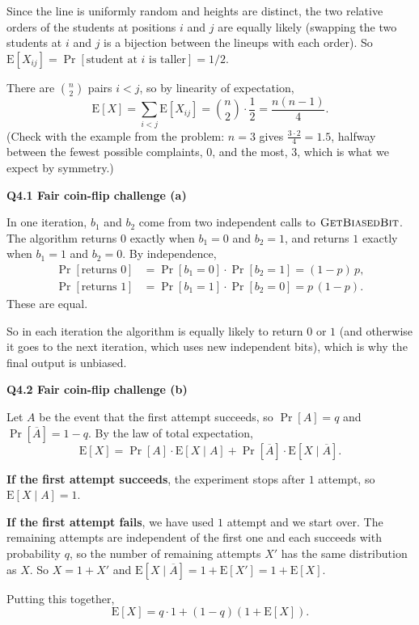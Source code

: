 \documentclass[11pt]{article}
\newcommand{\Ex}{\mathrm{E}}
\newcommand{\algo}[1]{\textsc{#1}}
\newcommand{\qpage}[1]{\clearpage\noindent\textbf{\large #1}\par\medskip}
\begin{document}
Since the line is uniformly random and heights are distinct, the two relative orders of the students at positions $i$ and $j$ are equally likely (swapping the two students at $i$ and $j$ is a bijection between the lineups with each order).
So $\Ex[X_{ij}] = \Pr[\text{student at } i \text{ is taller}] = 1/2$.

There are $\binom{n}{2}$ pairs $i < j$, so by linearity of expectation,
\[
  \Ex[X] = \sum_{i < j} \Ex[X_{ij}] = \binom{n}{2} \cdot \frac{1}{2} = \frac{n(n-1)}{4}.
\]
(Check with the example from the problem: $n = 3$ gives $\frac{3 \cdot 2}{4} = 1.5$, halfway between the fewest possible complaints, $0$, and the most, $3$, which is what we expect by symmetry.)

\qpage{Q4.1 Fair coin-flip challenge (a)}

In one iteration, $b_1$ and $b_2$ come from two independent calls to $\algo{GetBiasedBit}$.
The algorithm returns $0$ exactly when $b_1 = 0$ and $b_2 = 1$, and returns $1$ exactly when $b_1 = 1$ and $b_2 = 0$.
By independence,
\begin{align*}
  \Pr[\text{returns } 0] &= \Pr[b_1 = 0] \cdot \Pr[b_2 = 1] = (1 - p)\, p, \\
  \Pr[\text{returns } 1] &= \Pr[b_1 = 1] \cdot \Pr[b_2 = 0] = p\, (1 - p).
\end{align*}
These are equal.

So in each iteration the algorithm is equally likely to return $0$ or $1$ (and otherwise it goes to the next iteration, which uses new independent bits), which is why the final output is unbiased.

\qpage{Q4.2 Fair coin-flip challenge (b)}

Let $A$ be the event that the first attempt succeeds, so $\Pr[A] = q$ and $\Pr[\overline{A}] = 1 - q$.
By the law of total expectation,
\[
  \Ex[X] = \Pr[A] \cdot \Ex[X \mid A] + \Pr[\overline{A}] \cdot \Ex[X \mid \overline{A}].
\]

\textbf{If the first attempt succeeds}, the experiment stops after $1$ attempt, so $\Ex[X \mid A] = 1$.

\textbf{If the first attempt fails}, we have used $1$ attempt and we start over.
The remaining attempts are independent of the first one and each succeeds with probability $q$, so the number of remaining attempts $X'$ has the same distribution as $X$.
So $X = 1 + X'$ and $\Ex[X \mid \overline{A}] = 1 + \Ex[X'] = 1 + \Ex[X]$.

Putting this together,
\[
  \Ex[X] = q \cdot 1 + (1 - q)(1 + \Ex[X]).
\]
\end{document}
